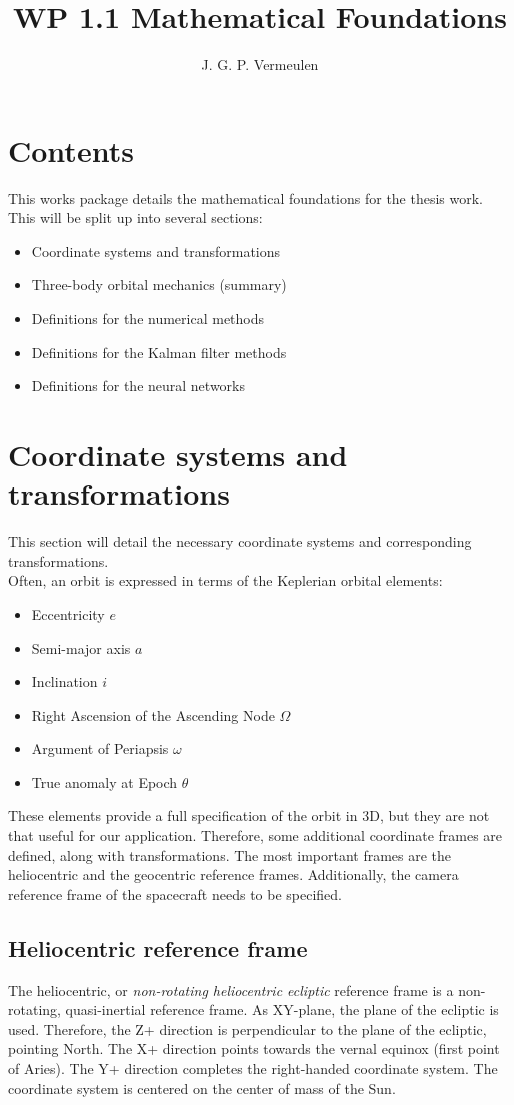 \documentclass[a4paper,10pt]{article}
\title{WP 1.1 Mathematical Foundations}
\author{J. G. P. Vermeulen}
\begin{document}
\maketitle

\section{Contents}

This works package details the mathematical foundations for the thesis work. This will be split up into several sections:
\begin{itemize}
\item Coordinate systems and transformations
\item Three-body orbital mechanics (summary)
\item Definitions for the numerical methods
\item Definitions for the Kalman filter methods
\item Definitions for the neural networks
\end{itemize}

\section{Coordinate systems and transformations}
This section will detail the necessary coordinate systems and corresponding transformations.\\

Often, an orbit is expressed in terms of the Keplerian orbital elements:
\begin{itemize}
\item Eccentricity $e$
\item Semi-major axis $a$
\item Inclination $i$
\item Right Ascension of the Ascending Node $\Omega$
\item Argument of Periapsis $\omega$
\item True anomaly at Epoch $\theta$
\end{itemize}

These elements provide a full specification of the orbit in 3D, but they are not that useful for our application. Therefore, some additional coordinate frames are defined, along with transformations. The most important frames are the heliocentric and the geocentric reference frames. Additionally, the camera reference frame of the spacecraft needs to be specified.

\subsection{Heliocentric reference frame}
The heliocentric, or \textit{non-rotating heliocentric ecliptic} reference frame is a non-rotating, quasi-inertial reference frame. As XY-plane, the plane of the ecliptic is used. Therefore, the Z+ direction is perpendicular to the plane of the ecliptic, pointing North. The X+ direction points towards the vernal equinox (first point of Aries). The Y+ direction completes the right-handed coordinate system. The coordinate system is centered on the center of mass of the Sun.
\end{document}
